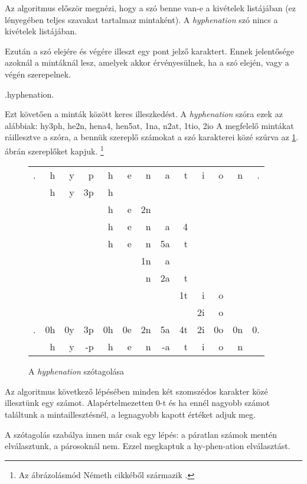\documentclass[a4paper, magyar]{article}
\begin{document}
Az algoritmus először megnézi, hogy a szó benne van-e a kivételek listájában (ez lényegében teljes szavakat tartalmaz mintaként). A \textit{hyphenation} szó nincs a kivételek listájában.

Ezután a szó elejére és végére illeszt egy pont  jelző karaktert. Ennek jelentősége azoknál a mintáknál lesz, amelyek akkor érvényesülnek, ha a szó elején, vagy a végén szerepelnek.
{\selectfont
	\begin{center}
	.hyphenation.
	\end{center}
}
Ezt követően a minták között keres illeszkedést. A \textit{hyphenation} szóra ezek az alábbiak: 
{\selectfont hy3ph, he2n, hena4, hen5at, 1na, n2at, 1tio,  2io}  \cite[37.\ oldal]{liang1983word}
A megfelelő mintákat ráillesztve a szóra, a bennük szereplő számokat a szó karakterei közé szúrva az \ref{liang-hyp}. ábrán szereplőket kapjuk.%
\footnote{Az ábrázolásmód N{\'e}meth cikkéből származik \cite{nemeth2006automatic}.}
\begin{figure}[ht]\centering
	{\selectfont
		\setlength{\tabcolsep}{0pt}
		\begin{tabular}{rrrrrrrrrrrrr}
			.& h& y& p& h& e& n& a & t& i& o& n& .\\
			 & h& y&3p& h\\
			 &  &  &  & h& e&2n\\
			 &  &  &  & h& e& n& a&4\phantom{t}\\
			 &  &  &  & h& e& n&5a&t\\
			 &  &  &  &  &  &1n& a\\
			 &  &  &  &  &  & n&2a& t\\
			 &  &  &  &  &  &  &  &1t& i& o\\
			 &  &  &  &  &  &  &  &  &2i& o\\
			 \hline
			 .&0h&0y&3p&0h&0e&2n&5a&4t&2i&0o&0n&0.\\
			  & h& y&-p& h& e& n&-a& t& i& o& n
		\end{tabular}
	}
\caption{A \textit{hyphenation} szótagolása}\par\medskip\centering
\label{liang-hyp}
\end{figure}


Az algoritmus következő lépésében minden két szomszédos karakter közé illesztünk egy számot. Alapértelmezetten $0$-t és ha ennél nagyobb számot találtunk a mintaillesztésnél, a legnagyobb kapott értéket adjuk meg.

A szótagolás szabálya innen már csak egy lépés: a páratlan számok mentén elválasztunk, a párosoknál nem. Ezzel megkaptuk a
{\selectfont
	hy-phen-ation%
}
elválasztást.
\end{document}
